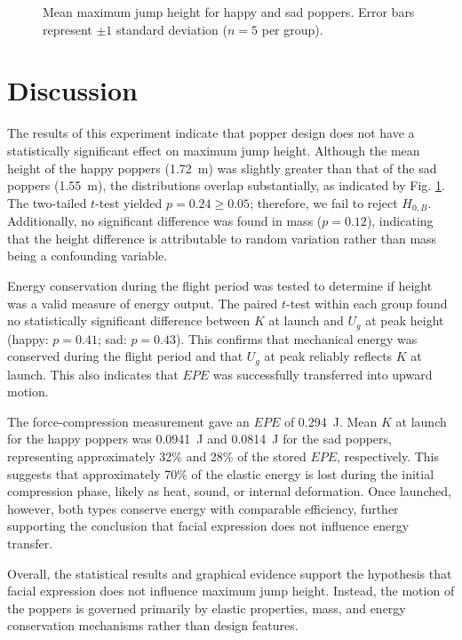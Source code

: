 \documentclass[amsmath,amssymb,aps,endfloats,linenumbers]{revtex4-2}
\begin{document}
\begin{figure}[ht]
\centering

\caption{Mean maximum jump height for happy and sad poppers. Error bars represent $\pm 1$ standard deviation ($n = 5$ per group).}
\label{fig:height_graph}
\end{figure}

\section{Discussion}
The results of this experiment indicate that popper design does not have a statistically significant effect on maximum jump height. Although the mean height of the happy poppers (\qty{1.72}{\meter}) was slightly greater than that of the sad poppers (\qty{1.55}{\meter}), the distributions overlap substantially, as indicated by Fig. \ref{fig:height_graph}. The two-tailed $t$-test yielded $p = 0.24 \geq 0.05$; therefore, we fail to reject $H_{0, B}$. Additionally, no significant difference was found in mass ($p = 0.12$), indicating that the height difference is attributable to random variation rather than mass being a confounding variable. 

Energy conservation during the flight period was tested to determine if height was a valid measure of energy output. The paired $t$-test within each group found no statistically significant difference between $K$ at launch and $U_g$ at peak height (happy: $p = 0.41$; sad: $p = 0.43$). This confirms that mechanical energy was conserved during the flight period and that $U_g$ at peak reliably reflects $K$ at launch. This also indicates that $EPE$ was successfully transferred into upward motion. 

The force-compression measurement gave an $EPE$ of \qty{0.294}{\joule}. Mean $K$ at launch for the happy poppers was \qty{0.0941}{\joule} and \qty{0.0814}{\joule} for the sad poppers, representing approximately \num{32}\% and \num{28}\% of the stored $EPE$, respectively. This suggests that approximately \num{70}\% of the elastic energy is lost during the initial compression phase, likely as heat, sound, or internal deformation. Once launched, however, both types conserve energy with comparable efficiency, further supporting the conclusion that facial expression does not influence energy transfer. 

Overall, the statistical results and graphical evidence  support the hypothesis that facial expression does not influence maximum jump height. Instead, the motion of the poppers is governed primarily by elastic properties, mass, and energy conservation mechanisms rather than design features.
\end{document}
